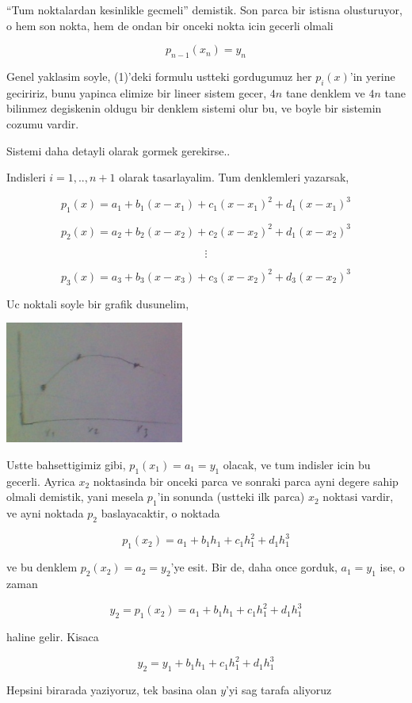 \documentclass[12pt,fleqn]{article}\usepackage{common}
\begin{document}
``Tum noktalardan kesinlikle gecmeli'' demistik. Son parca bir istisna
olusturuyor, o hem son nokta, hem de ondan bir onceki nokta icin gecerli
olmali

\[ p_{n-1}(x_n) = y_n \]

Genel yaklasim soyle, (1)'deki formulu ustteki gordugumuz her $p_i(x)$'in
yerine geciririz, bunu yapinca elimize bir lineer sistem gecer, $4n$ tane
denklem ve $4n$ tane bilinmez degiskenin oldugu bir denklem sistemi olur
bu, ve boyle bir sistemin cozumu vardir.

Sistemi daha detayli olarak gormek gerekirse..

Indisleri $i=1,..,n+1$ olarak tasarlayalim. Tum denklemleri yazarsak,

\[ p_1(x)  = a_1 + b_1(x-x_1) + c_1(x-x_1)^2 + d_1(x-x_1)^3\]

\[ p_2(x)  = a_2 + b_2(x-x_2) + c_2(x-x_2)^2 + d_1(x-x_2)^3\]

\[ \vdots \]

\[ p_3(x)  = a_3 + b_3(x-x_3) + c_3(x-x_2)^2 + d_3(x-x_2)^3\]

Uc noktali soyle bir grafik dusunelim,

\includegraphics[height=4cm]{spline2.png}

Ustte bahsettigimiz gibi, $p_1(x_1) = a_1 = y_1$ olacak, ve tum indisler
icin bu gecerli. Ayrica $x_2$ noktasinda bir onceki parca ve sonraki parca
ayni degere sahip olmali demistik, yani mesela $p_1$'in sonunda (ustteki
ilk parca) $x_2$ noktasi vardir, ve ayni noktada $p_2$ baslayacaktir, o
noktada 

\[ p_1(x_2) = a_1 + b_1h_1 + c_1h_1^2 + d_1h_1^3  \]

ve bu denklem $p_2(x_2) = a_2 = y_2$'ye esit. Bir de, daha once gorduk, $a_1 =
y_1$ 
ise, o zaman 

\[ y_2 = p_1(x_2) = a_1 + b_1h_1 + c_1h_1^2 + d_1h_1^3 \]

haline gelir. Kisaca

\[ y_2 =  y_1 + b_1h_1 + c_1h_1^2 + d_1h_1^3 \]

Hepsini birarada yaziyoruz, tek basina olan $y$'yi sag tarafa aliyoruz
\end{document}
